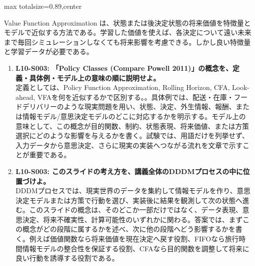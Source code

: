 \begin{minipage}[t]{0.58\textwidth}
\begin{adjustbox}{max totalsize={\textwidth}{0.89\textheight},center}
\begin{minipage}{\textwidth}
Value Function Approximation は、状態または後決定状態の将来価値を特徴量とモデルで近似する方法である。学習した価値を使えば、各決定について遠い未来まで毎回シミュレーションしなくても将来影響を考慮できる。しかし良い特徴量と学習データが必要である。\par{}\begin{enumerate}\item \textbf{L10-S003: 「Policy Classes (Compare Powell 2011)」の概念を、定義・具体例・モデル上の意味の順に説明せよ。}\\定義としては、Policy Function Approximation, Rolling Horizon, CFA, Look-ahead, VFAを何を近似するかで区別する。。具体例では、配送・在庫・フードデリバリーのような現実問題を用い、状態、決定、外生情報、報酬、または情報モデル/意思決定モデルのどこに対応するかを明示する。モデル上の意味として、この概念が目的関数、制約、状態表現、将来価値、または方策選択にどのような影響を与えるかを書く。試験では、用語だけを列挙せず、入力データから意思決定、さらに現実の実装へつながる流れを文章で示すことが重要である。\item \textbf{L10-S003: このスライドの考え方を、講義全体のDDDMプロセスの中に位置づけよ。}\\DDDMプロセスでは、現実世界のデータを集約して情報モデルを作り、意思決定モデルまたは方策で行動を選び、実装後に結果を観測して次の状態へ進む。このスライドの概念は、そのどこか一部だけではなく、データ表現、意思決定、将来不確実性、計算可能性のいずれかに関わる。答案では、まずこの概念がどの段階に属するかを述べ、次に他の段階へどう影響するかを書く。例えば価値関数なら将来価値を現在決定へ戻す役割、FIFOなら旅行時間情報モデルの整合性を保証する役割、CFAなら目的関数を調整して将来に良い行動を誘導する役割である。\end{enumerate}
\end{minipage}
\end{adjustbox}
\end{minipage}


